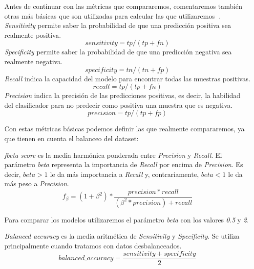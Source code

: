 Antes de continuar con las métricas que compararemos, comentaremos también otras más básicas que son utilizadas para calcular las que utilizaremos\ \cite{Precisio23:online}.
\\ \textit{Sensitivity} permite saber la probabilidad de que una predicción positiva sea realmente positiva.
    \begin{equation}
        sensitivity=tp/(tp+fn)
    \end{equation}
\textit{Specificity} permite saber la probabilidad de que una predicción negativa sea realmente negativa.
\begin{equation}
        specificity=tn/(tn+fp)
    \end{equation}
\textit{Recall} indica la capacidad del modelo para encontrar todas las muestras positivas. 
    \begin{equation}
        recall=tp/(tp+fn)
    \end{equation}
\textit{Precision} indica la precisión de las predicciones positivas, es decir, la habilidad del clasificador para no predecir como positiva una muestra que es negativa.
    \begin{equation}
        precision=tp/(tp+fp)
    \end{equation}

Con estas métricas básicas podemos definir las que realmente compararemos, ya que tienen en cuenta el balanceo del \gls{dataset}:

\textit{fbeta score} es la media harmónica ponderada entre \textit{Precision} y \textit{Recall}. 
El parámetro \textit{beta} representa la importancia de \textit{Recall} por encima de \textit{Precision}. 
Es decir, \(beta>1\) le da más importancia a \textit{Recall} y, contrariamente, \(beta<1\) le da más peso a \textit{Precision}.\ \cite{FscoreWi30:online}
    \begin{equation}
        f_\beta = (1 + \beta^2)*\frac{precision*recall}{(\beta^2*precision)+recall}
    \end{equation}

Para comparar los modelos utilizaremos el parámetro \textit{beta} con los valores \textit{0.5} y \textit{2}. 

\textit{Balanced accuracy} es la media aritmética de \textit{Sensitivity} y \textit{Specificity}. Se utiliza principalmente cuando tratamos con datos desbalanceados.\ \cite{Balanced44:online}
    \begin{equation}
        balanced\_accuracy =\frac{sensitivity + specificity}{2}
    \end{equation}
